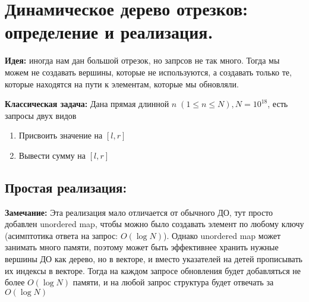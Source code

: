 \setcounter{section}{66}
\section{Динамическое дерево отрезков: определение и реализация.}
\par \textbf{Идея:} иногда нам дан большой отрезок, но запрсов не так много. Тогда мы можем не создавать вершины, которые не используются, а создавать только те, которые находятся на пути к элементам, которые мы обновляли.
\par \textbf{Классическая задача:} Дана прямая длинной $n\; (1 \leqslant n \leqslant N), N=10^{18}$, есть запросы двух видов
\begin{enumerate}
    \item Присвоить значение на $[l, r]$
    \item Вывести сумму на $[l,r]$
\end{enumerate}
\subsection*{Простая реализация:}

\par \textbf{Замечание:} Эта реализация мало отличается от обычного ДО, тут просто добавлен unordered map, чтобы можно было создавать элемент по любому ключу (асимптотика ответа на запрос: $O(\log N)$). Однако unordered map может занимать много памяти, поэтому может быть эффективнее хранить нужные вершины ДО как дерево, но в векторе, и вместо указателей на детей прописывать их индексы в векторе. Тогда на каждом запросе обновления будет добавляться не более $O(\log N)$ памяти, и на любой запрос структура будет отвечать за $O(\log N)$